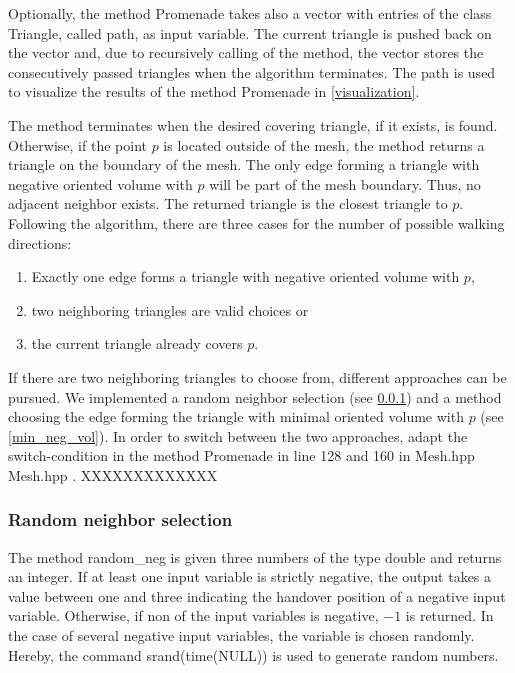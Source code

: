 \documentclass[10pt]{article}
\begin{document}
Optionally, the method {\ttfamily Promenade} takes also a vector with entries of the class {\ttfamily Triangle}, called {\ttfamily path}, as input variable. The current triangle is pushed back on the vector and, due to recursively calling of the method, the vector stores the consecutively passed triangles when the algorithm terminates. The path is used to visualize the results of the method {\ttfamily Promenade} in \ref{visualization}.

The method terminates when the desired covering triangle, if it exists, is found. Otherwise, if the point $p$ is located outside of the mesh, the method returns a triangle on the boundary of the mesh. The only edge forming a triangle with negative oriented volume with $p$ will be part of the mesh boundary. Thus, no adjacent neighbor exists. The returned triangle is the closest triangle to $p$.\\

Following the algorithm, there are three cases for the number of possible walking directions:
\begin{enumerate}
	\item Exactly one edge forms a triangle with negative oriented volume with $p$,
	\item two neighboring triangles are valid choices or
	\item the current triangle already covers $p$.
\end{enumerate}
If there are two neighboring triangles to choose from, different approaches can be pursued. We implemented a random neighbor selection (see \ref{ran_neighb_sel}) and a method choosing the edge forming the triangle with minimal oriented volume with $p$ (see \ref{min_neg_vol}). In order to switch between the two approaches, adapt the switch-condition in the method {\ttfamily Promenade} in line 128 and 160 in Mesh.hpp {\ttfamily Mesh.hpp }. XXXXXXXXXXXXX

\subsubsection{Random neighbor selection} \label{ran_neighb_sel}

The method {\ttfamily random\_neg} is given three numbers of the type {\ttfamily double} and returns an integer. If at least one input variable is strictly negative, the output takes a value between one and three indicating the handover position of a negative input variable. Otherwise, if non of the input variables is negative, $-1$ is returned. In the case of several negative input variables, the variable is chosen randomly. Hereby, the command {\ttfamily srand(time(NULL))} is used to generate random numbers.
\end{document}
